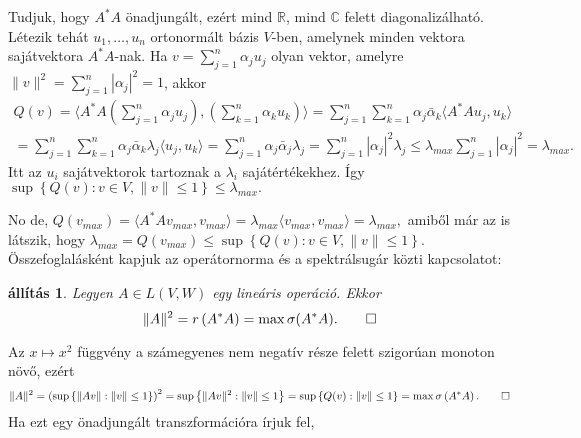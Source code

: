 \documentclass[9pt, a4paper, showtrims]{memoir}
\makeatletter
\renewenvironment{proof}[1][\proofname]
    {\par\pushQED{\qed}%
    \normalfont \topsep6\p@\@plus6\p@\relax
    \trivlist
    \item[\hskip\labelsep
        \itshape
    #1\@addpunct{:}]\ignorespaces}
    {\popQED\endtrivlist\@endpefalse}
\theoremstyle{plain}
\newtheorem{proposition}{állítás}[chapter]
\theoremstyle{remark}
\theoremstyle{definition}
\newcommand{\ip}[2]{\langle#1,#2\rangle}
\makeatother
\begin{document}
\begin{proof}
	Tudjuk, hogy $A^\ast A$ önadjungált, ezért mind $\mathbb{R}$, mind $\mathbb{C}$ felett diagonalizálható.
	Létezik tehát $u_1,\ldots,u_n$ ortonormált bázis $V$-ben,
	amelynek minden vektora sajátvektora $A^\ast A$-nak.
	Ha $v=\sum_{j=1}^n\alpha_ju_j$ olyan vektor,
	amelyre $\|v\|^2=\sum_{j=1}^n|\alpha_j|^2=1$,
	akkor
	\begin{multline*}
		Q\left( v \right)
		=
		\ip{A^\ast A\left( \sum_{j=1}^n\alpha_ju_j \right)}{\left( \sum_{k=1}^n\alpha_ku_k \right)}
		=
		\sum_{j=1}^n\sum_{k=1}^n\alpha_j\bar{\alpha}_k\ip{A^\ast Au_j}{u_k}
		\\
		=
		\sum_{j=1}^n\sum_{k=1}^n\alpha_j\bar{\alpha}_k\lambda_j\ip{u_j}{u_k}
		=
		\sum_{j=1}^n\alpha_j\bar{\alpha}_j\lambda_j
		=
		\sum_{j=1}^n|\alpha_j|^2\lambda_j
		\leq
		\lambda_{max}\sum_{j=1}^n|\alpha_j|^2
		=
		\lambda_{max}.
	\end{multline*}
	Itt az $u_i$ sajátvektorok tartoznak a $\lambda_i$ sajátértékekhez.
	Így
	\begin{math}
		\sup\left\{ Q\left( v \right):v\in V,\|v\|\leq 1 \right\}
		\leq
		\lambda_{max}.
	\end{math}

	No de,
	\begin{math}
		Q\left( v_{max} \right)
		=
		\ip{A^\ast Av_{max}}{v_{max}}
		=
		\lambda_{max}\ip{v_{max}}{v_{max}}
		=\lambda_{max},
	\end{math}
	amiből már az is látszik, hogy
	\begin{math}
		\lambda_{max}
		=
		Q\left( v_{max} \right)
		\leq
		\sup\left\{ Q\left( v \right):v\in V,\|v\|\leq 1 \right\}.
	\end{math}
\end{proof}
Összefoglalásként kapjuk az operátornorma és a spektrálsugár közti kapcsolatot:
\begin{proposition}
	Legyen $A\in L\left( V,W \right)$ egy lineáris operáció.
	Ekkor
	\[
		\|A\|^2=r\left( A^\ast A \right)=\max\sigma(A^\ast A).
		\qedhere
	\]
\end{proposition}
\begin{proof}
	Az $x \mapsto x^2$ függvény a számegyenes nem negatív része felett szigorúan monoton növő,
	ezért
	\[
		\|A\|^2
		=
		\left(
		\sup\left\{ \|Av\|:\|v\|\leq 1 \right\}
		\right)^2
		=
		\sup\left\{ \|Av\|^2:\|v\|\leq 1 \right\}
		=
		\sup\left\{ Q(v):\|v\|\leq 1 \right\}
		=
		\max\sigma\left( A^\ast A \right).
		\qedhere
	\]
\end{proof}
Ha ezt egy önadjungált transzformációra írjuk fel,
\end{document}
